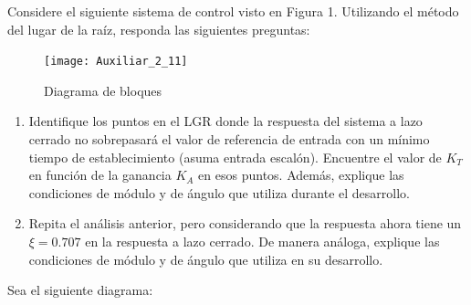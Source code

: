 \documentclass[
  11pt,
  letterpaper,
   addpoints,
  ]{exam}
\begin{document}
\begin{questions}
    \question Considere el siguiente sistema de control visto en Figura 1. Utilizando el método del lugar de la raíz, responda las siguientes preguntas:
    \begin{figure}[h]
        \centering
        \texttt{[image: Auxiliar\_2\_11]}
        \caption{Diagrama de bloques}
    \end{figure}
    \begin{enumerate}
        \item Identifique los puntos en el LGR donde la respuesta del sistema a lazo cerrado no sobrepasará el valor de referencia de entrada con un mínimo tiempo de establecimiento (asuma entrada escalón). Encuentre el valor de \(K_T\) en función de la ganancia \(K_A\) en esos puntos. Además, explique las condiciones de módulo y de ángulo que utiliza durante el desarrollo.
        \item Repita el análisis anterior, pero considerando que la respuesta ahora tiene un \(\xi=0.707\) en la respuesta a lazo cerrado. De manera análoga, explique las condiciones de módulo y de ángulo que utiliza en su desarrollo.
    \end{enumerate}
    \newpage
    
   
    \question Sea el siguiente diagrama:
    \begin{center}

\end{center}
\end{questions}
\end{document}
